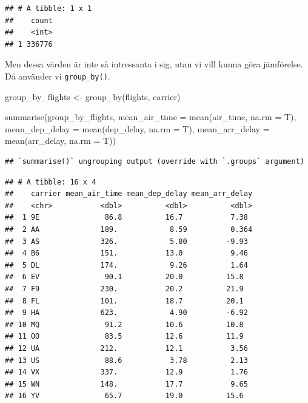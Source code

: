 \documentclass[
]{book}
\newenvironment{Shaded}{\begin{snugshade}}{\end{snugshade}}
\newcommand{\AttributeTok}[1]{\textcolor[rgb]{0.77,0.63,0.00}{#1}}
\newcommand{\FunctionTok}[1]{\textcolor[rgb]{0.00,0.00,0.00}{#1}}
\newcommand{\NormalTok}[1]{#1}
\newcommand{\OtherTok}[1]{\textcolor[rgb]{0.56,0.35,0.01}{#1}}
\begin{document}
\begin{verbatim}
## # A tibble: 1 x 1
##    count
##    <int>
## 1 336776
\end{verbatim}

Men dessa värden är inte så intressanta i sig, utan vi vill kunna göra jämförelse. Då använder vi \texttt{group\_by()}.

\begin{Shaded}
\begin{Highlighting}[]
\NormalTok{group\_by\_flights }\OtherTok{\textless{}{-}} \FunctionTok{group\_by}\NormalTok{(flights, carrier)}

\FunctionTok{summarise}\NormalTok{(group\_by\_flights, }
          \AttributeTok{mean\_air\_time =} \FunctionTok{mean}\NormalTok{(air\_time, }\AttributeTok{na.rm =}\NormalTok{ T),}
          \AttributeTok{mean\_dep\_delay =} \FunctionTok{mean}\NormalTok{(dep\_delay, }\AttributeTok{na.rm =}\NormalTok{ T),}
          \AttributeTok{mean\_arr\_delay =} \FunctionTok{mean}\NormalTok{(arr\_delay, }\AttributeTok{na.rm =}\NormalTok{ T))}
\end{Highlighting}
\end{Shaded}

\begin{verbatim}
## `summarise()` ungrouping output (override with `.groups` argument)
\end{verbatim}

\begin{verbatim}
## # A tibble: 16 x 4
##    carrier mean_air_time mean_dep_delay mean_arr_delay
##    <chr>           <dbl>          <dbl>          <dbl>
##  1 9E               86.8          16.7           7.38 
##  2 AA              189.            8.59          0.364
##  3 AS              326.            5.80         -9.93 
##  4 B6              151.           13.0           9.46 
##  5 DL              174.            9.26          1.64 
##  6 EV               90.1          20.0          15.8  
##  7 F9              230.           20.2          21.9  
##  8 FL              101.           18.7          20.1  
##  9 HA              623.            4.90         -6.92 
## 10 MQ               91.2          10.6          10.8  
## 11 OO               83.5          12.6          11.9  
## 12 UA              212.           12.1           3.56 
## 13 US               88.6           3.78          2.13 
## 14 VX              337.           12.9           1.76 
## 15 WN              148.           17.7           9.65 
## 16 YV               65.7          19.0          15.6
\end{verbatim}
\end{document}

